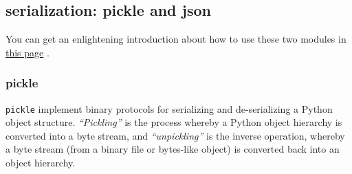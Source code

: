 \subsection{serialization: pickle and json}
You can get an enlightening introduction about how to use these two modules in \href{https://www.liaoxuefeng.com/wiki/0014316089557264a6b348958f449949df42a6d3a2e542c000/00143192607210600a668b5112e4a979dd20e4661cc9c97000}{this page} .
\subsubsection{pickle}
\texttt{pickle} implement binary protocols for serializing and de-serializing a Python object structure. \textit{“Pickling”} is the process whereby a Python object hierarchy is converted into a byte stream, and \textit{“unpickling”} is the inverse operation, whereby a byte stream (from a binary file or bytes-like object) is converted back into an object hierarchy. 

